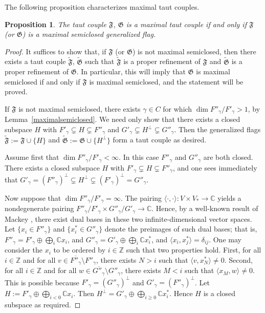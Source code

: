 \documentclass{article}
\newcommand {\Z} {\mathbb{Z}}
\newcommand {\C} {\mathbb{C}}
\def\F{\mathfrak{F}}
\def\G{\mathfrak{G}}
\newtheorem{prop}[thm]{Proposition}
\begin{document}
The following proposition characterizes maximal taut couples.


\begin{prop} \label{noobstruction}
The taut couple $\F$, $\G$ is a maximal taut couple if and only if $\F$ (or $\G$) is a maximal semiclosed generalized flag.
\end{prop}


\begin{proof}
It suffices to show that, if $\F$ (or $\G$) is not maximal semiclosed, then there exists a taut couple $\tilde{\F}$, $\tilde{\G}$ such that $\tilde{\F}$ is a proper refinement of $\F$ and $\tilde{\G}$ is a proper refinement of $\G$.  In particular, this will imply that $\G$ is maximal semiclosed if and only if $\F$ is maximal semiclosed, and the statement will be proved.

If $\F$ is not maximal semiclosed, there exists $\gamma \in C$ for which $\dim {F''_\gamma} / {F'_\gamma} > 1$, by Lemma~\ref{maximalsemiclosed}.  We need only show that there exists a closed subspace $H$ with $F'_\gamma \subsetneq H \subsetneq F''_\gamma$ and $G'_\gamma \subsetneq H^\perp \subsetneq G''_\gamma$.  
Then the generalized flags $\tilde{\F} := \F \cup \{H\}$ and $\tilde{\G} := \G \cup \{H^\perp \}$ form a taut couple as desired.

Assume first that $\dim {F''_\gamma} / {F'_\gamma} < \infty$.  In this case $F''_\gamma$ and $G''_\gamma$ are both closed.  There exists a closed subspace $H$ with $F'_\gamma \subsetneq H \subsetneq F''_\gamma$, and one sees immediately that $G'_\gamma = (F''_\gamma)^\perp \subsetneq H^\perp \subsetneq (F'_\gamma)^\perp = G''_\gamma$.

Now suppose that $\dim {F''_\gamma} / {F'_\gamma} = \infty$.  The pairing $\langle \cdot , \cdot \rangle \colon V \times V_* \rightarrow \C$ yields a nondegenerate pairing ${F''_\gamma} / {F'_\gamma} \times {G''_\gamma} / {G'_\gamma} \rightarrow \C$.  Hence, by a well-known result of Mackey \cite{Mackey}, there exist dual bases in these two infinite-dimensional vector spaces.  Let $\{x_i \in F''_\gamma\}$ and $\{x_i^* \in G''_\gamma\}$ denote the preimages of such dual bases; that is, $F''_\gamma = F'_\gamma \oplus \bigoplus_i \C x_i$, and $G''_\gamma = G'_\gamma \oplus \bigoplus_i \C x_i^*$, and $\langle x_i , x_j^* \rangle = \delta_{ij}$.  One may consider the $x_i$ to be ordered by $i \in \Z$ such that two properties hold.  First, for all $i \in \Z$ and for all $v \in \overline{F''_\gamma} \setminus F''_\gamma$, there exists $N > i$ such that $\langle v , x_N^* \rangle \neq 0$.  Second, for all $i \in \Z$ and for all $w \in \overline{G''_\gamma} \setminus G''_\gamma$, there exists $M < i$ such that $\langle x_M , w \rangle \neq 0$.  This is possible because $F'_\gamma = (G''_\gamma)^\perp$ and $G'_\gamma = (F''_\gamma)^\perp$.  Let $H:= F'_\gamma \oplus \bigoplus_{i < 0} \C x_i$. Then $H^\perp = G'_\gamma \oplus \bigoplus_{i \geq 0} \C x_i^*$.  Hence $H$ is a closed subspace as required.
\end{proof}
\end{document}
